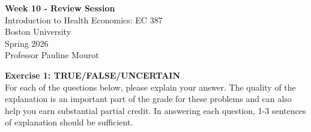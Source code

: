 \documentclass[12pt]{article}
\begin{document}
\begin{center}
\textbf{Week 10 - Review Session} \\
Introduction to Health Economics: EC 387 \\
Boston University \\
Spring 2026 \\
Professor Pauline Mourot
\end{center}

\vspace{1em}

\noindent \textbf{Exercise 1: TRUE/FALSE/UNCERTAIN}\\

For each of the questions below, please explain your answer.
The quality of the explanation is an important part of the grade for these problems and
can also help you earn substantial partial credit.
In answering each question, 1-3 sentences of explanation should be sufficient.

\vspace{7mm}
\end{document}
